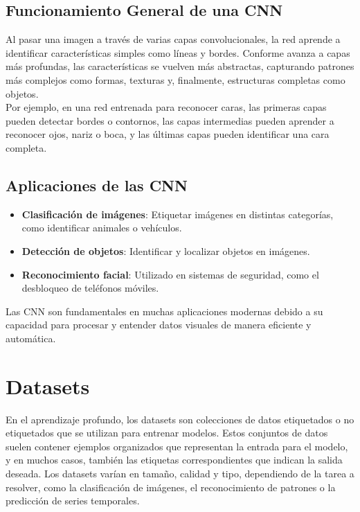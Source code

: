 \subsection{Funcionamiento General de una CNN}\label{subsec:funcionamiento-general-de-una-cnn}
Al pasar una imagen a través de varias capas convolucionales, la red aprende a identificar características simples como
líneas y bordes.
Conforme avanza a capas más profundas, las características se vuelven más abstractas, capturando patrones más complejos
como formas, texturas y, finalmente, estructuras completas como objetos. \\[6pt]

Por ejemplo, en una red entrenada para reconocer caras, las primeras capas pueden detectar bordes o contornos, las
capas intermedias pueden aprender a reconocer ojos, nariz o boca, y las últimas capas pueden identificar una cara
completa.

\subsection{Aplicaciones de las CNN}\label{subsec:aplicaciones-de-las-cnn}
\begin{itemize}
    \item \textbf{Clasificación de imágenes}: Etiquetar imágenes en distintas categorías, como identificar animales o
vehículos.
    \item \textbf{Detección de objetos}: Identificar y localizar objetos en imágenes.
    \item \textbf{Reconocimiento facial}: Utilizado en sistemas de seguridad, como el desbloqueo de teléfonos móviles.
\end{itemize}

Las CNN son fundamentales en muchas aplicaciones modernas debido a su capacidad para procesar y entender datos visuales
de manera eficiente y automática.

\section{Datasets}\label{sec:datasets}
En el aprendizaje profundo, los datasets son colecciones de datos etiquetados o no etiquetados que se utilizan para
entrenar modelos.
Estos conjuntos de datos suelen contener ejemplos organizados que representan la entrada para el modelo, y en muchos
casos, también las etiquetas correspondientes que indican la salida deseada.
Los datasets varían en tamaño, calidad y tipo, dependiendo de la tarea a resolver, como la clasificación de imágenes,
el reconocimiento de patrones o la predicción de series temporales.

